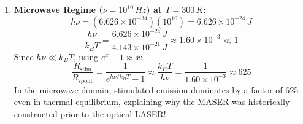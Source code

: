 \begin{example}
\begin{enumerate}
    \item \textbf{Microwave Regime ($\nu = 10^{10}\,\si{Hz}$) at $T = 300\,\si{K}$}:
    \begin{equation*}
        h\nu = (6.626 \times 10^{-34})(10^{10}) = 6.626 \times 10^{-24}\,\si{J}
    \end{equation*}
    \begin{equation*}
        \frac{h\nu}{k_B T} = \frac{6.626 \times 10^{-24}\,\si{J}}{4.143 \times 10^{-21}\,\si{J}} \approx 1.60 \times 10^{-3} \ll 1
    \end{equation*}
    Since $h\nu \ll k_B T$, using $e^x - 1 \approx x$:
    \begin{equation*}
        \frac{R_{\text{stim}}}{R_{\text{spont}}} = \frac{1}{e^{h\nu/k_B T} - 1} \approx \frac{k_B T}{h\nu} = \frac{1}{1.60 \times 10^{-3}} \approx 625
    \end{equation*}
    In the microwave domain, stimulated emission dominates by a factor of 625 even in thermal equilibrium, explaining why the MASER was historically constructed prior to the optical LASER!
\end{enumerate}
\end{example}

